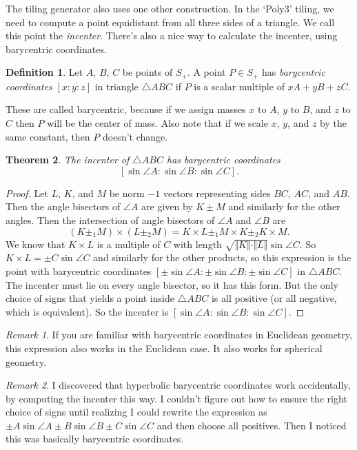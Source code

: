 \documentclass{article}
\newtheorem{thm}{Theorem}
\theoremstyle{definition}
\newtheorem{defn}[thm]{Definition}
\theoremstyle{remark}
\newtheorem*{rmk}{Remark}
\begin{document}
The tiling generator also uses one other construction. In the `Poly3' tiling, we need to compute a point equidistant from all three sides of a triangle. We call this point the \emph{incenter}. There's also a nice way to calculate the incenter, using barycentric coordinates.
\begin{defn}
    Let $A$, $B$, $C$ be points of $S_+$. A point $P\in S_+$ has \emph{barycentric coordinates} $[x:y:z]$ in triangle $\triangle ABC$ if $P$ is a scalar multiple of $xA+yB+zC$.
\end{defn}
These are called barycentric, because if we assign masses $x$ to $A$, $y$ to $B$, and $z$ to $C$ then $P$ will be the center of mass. Also note that if we scale $x$, $y$, and $z$ by the same constant, then $P$ doesn't change.
\begin{thm}
    The incenter of $\triangle ABC$ has barycentric coordinates
    \[[\sin \angle A:\sin \angle B:\sin \angle C].\]
\end{thm}
\begin{proof}
    Let $L$, $K$, and $M$ be norm $-1$ vectors representing sides $BC$, $AC$, and $AB$. Then the angle bisectors of $\angle A$ are given by $K\pm M$ and similarly for the other angles. Then the intersection of angle bisectors of $\angle A$ and $\angle B$ are
    \[(K\pm_1 M)\times (L\pm_2 M)=K\times L\pm_1 M\times K\pm_2 K\times M.\]
    We know that $K\times L$ is a multiple of $C$ with length $\sqrt{\Vert K\Vert\cdot \Vert L\Vert}\sin\angle C$. So $K\times L=\pm C\sin\angle C$ and similarly for the other products, so this expression is the point with barycentric coordinates $[\pm \sin \angle A:\pm\sin\angle B:\pm\sin\angle C]$ in $\triangle ABC$. The incenter must lie on every angle bisector, so it has this form. But the only choice of signs that yields a point inside $\triangle ABC$ is all positive (or all negative, which is equivalent). So the incenter is $[\sin \angle A:\sin \angle B:\sin \angle C]$.
\end{proof}
\begin{rmk}
    If you are familiar with barycentric coordinates in Euclidean geometry, this expression also works in the Euclidean case. It also works for spherical geometry.
\end{rmk}
\begin{rmk}
    I discovered that hyperbolic barycentric coordinates work accidentally, by computing the incenter this way. I couldn't figure out how to ensure the right choice of signs until realizing I could rewrite the expression as $\pm A\sin\angle A\pm B\sin\angle B\pm C\sin\angle C$ and then choose all positives. Then I noticed this was basically barycentric coordinates.
\end{rmk}
\end{document}
